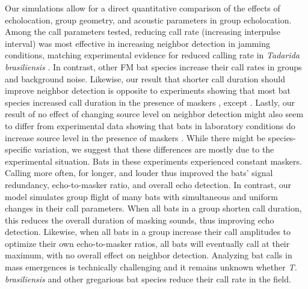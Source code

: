 \documentclass[
]{book}
\begin{document}
Our simulations allow for a direct quantitative comparison of the effects of echolocation, group geometry, and acoustic parameters in group echolocation. Among the call parameters tested, reducing call rate (increasing interpulse interval) was most effective in increasing neighbor detection in jamming conditions, matching experimental evidence for reduced calling rate in \emph{Tadarida brasiliensis} \citep{jarvis2013a, adams2017a}. In contrast, other FM bat species increase their call rates in groups and background noise\citep{amichai2015a, lin2016a, cvikel2015b, luo2015a}. Likewise, our result that shorter call duration should improve neighbor detection is opposite to experiments showing that most bat species increased call duration in the presence of maskers \citep{amichai2015a, tressler2009a, m1989a, luo2015a, hase2016a}, except \citep{cvikel2015b}. Lastly, our result of no effect of changing source level on neighbor detection might also seem to differ from experimental data showing that bats in laboratory conditions do increase source level in the presence of maskers \citep{amichai2015a, tressler2009a, luo2015a, hase2016a}. While there might be species-specific variation, we suggest that these differences are mostly due to the experimental situation. Bats in these experiments experienced constant maskers. Calling more often, for longer, and louder thus improved the bats' signal redundancy, echo-to-masker ratio, and overall echo detection. In contrast, our model simulates group flight of many bats with simultaneous and uniform changes in their call parameters. When all bats in a group shorten call duration, this reduces the overall duration of masking sounds, thus improving echo detection. Likewise, when all bats in a group increase their call amplitudes to optimize their own echo-to-masker ratios, all bats will eventually call at their maximum, with no overall effect on neighbor detection. Analyzing bat calls in mass emergences is technically challenging and it remains unknown whether \emph{T. brasiliensis} and other gregarious bat species reduce their call rate in the field.
\end{document}
